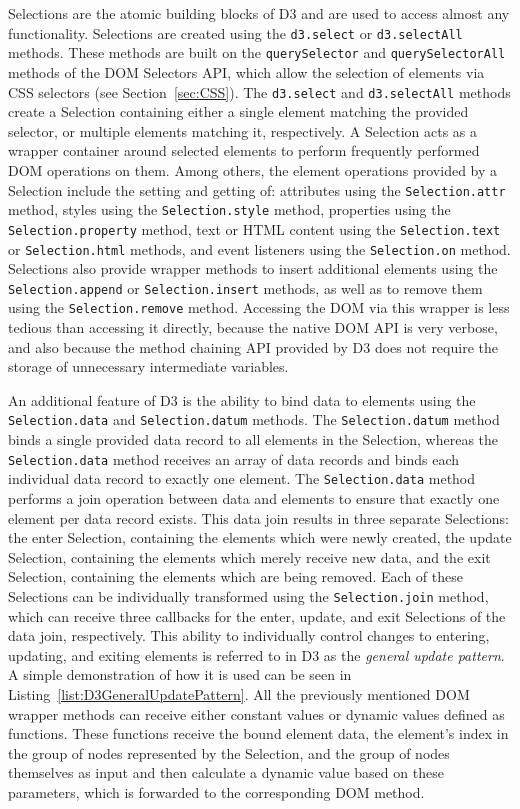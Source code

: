 Selections are the atomic building blocks of D3 and are used to access
almost any functionality.  Selections are created using the
\lstinline{d3.select} or \lstinline{d3.selectAll} methods.  These
methods are built on the \lstinline{querySelector} and
\lstinline{querySelectorAll} methods of the DOM Selectors API, which
allow the selection of elements via CSS selectors (see
Section~\ref{sec:CSS}). The \lstinline{d3.select} and
\lstinline{d3.selectAll} methods create a Selection containing either
a single element matching the provided selector, or multiple elements
matching it, respectively. A Selection acts as a wrapper container
around selected elements to perform frequently performed DOM
operations on them.  Among others, the element operations provided by
a Selection include the setting and getting of: attributes using the
\lstinline{Selection.attr} method, styles using the
\lstinline{Selection.style} method, properties using the
\lstinline{Selection.property} method, text or HTML content using the
\lstinline{Selection.text} or \lstinline{Selection.html} methods, and
event listeners using the \lstinline{Selection.on} method. Selections
also provide wrapper methods to insert additional elements using the
\lstinline{Selection.append} or \lstinline{Selection.insert} methods,
as well as to remove them using the \lstinline{Selection.remove}
method. Accessing the DOM via this wrapper is less tedious than
accessing it directly, because the native DOM API is very verbose, and
also because the method chaining API provided by D3 does not require
the storage of unnecessary intermediate variables.

An additional feature of D3 is the ability to bind data to elements
using the \lstinline{Selection.data} and \lstinline{Selection.datum}
methods. The \lstinline{Selection.datum} method binds a single
provided data record to all elements in the Selection, whereas the
\lstinline{Selection.data} method receives an array of data records
and binds each individual data record to exactly one element.  The
\lstinline{Selection.data} method performs a join operation between
data and elements to ensure that exactly one element per data record
exists. This data join results in three separate Selections: the enter
Selection, containing the elements which were newly created, the
update Selection, containing the elements which merely receive new
data, and the exit Selection, containing the elements which are being
removed. Each of these Selections can be individually transformed
using the \lstinline{Selection.join} method, which can receive three
callbacks for the enter, update, and exit Selections of the data join,
respectively. This ability to individually control changes to
entering, updating, and exiting elements is referred to in D3 as the
\emph{general update pattern}. A simple demonstration of how it is
used can be seen in Listing~\ref{list:D3GeneralUpdatePattern}. All the
previously mentioned DOM wrapper methods can receive either constant
values or dynamic values defined as functions. These functions receive
the bound element data, the element's index in the group of nodes
represented by the Selection, and the group of nodes themselves as
input and then calculate a dynamic value based on these parameters,
which is forwarded to the corresponding DOM method.


